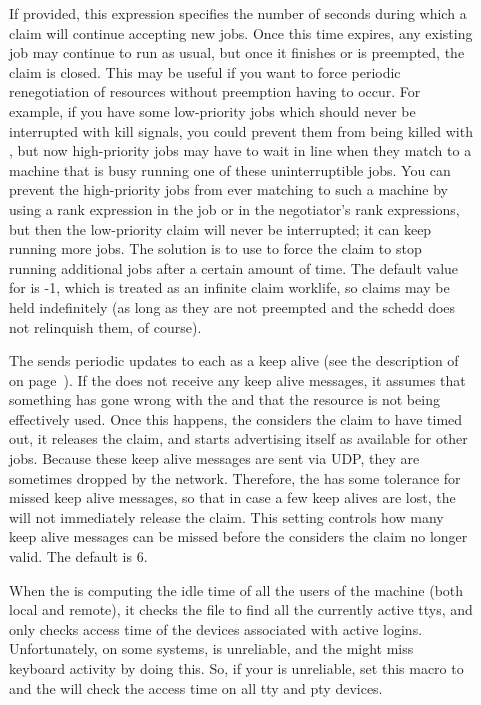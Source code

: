 \begin{description}
\item[] \label{param:ClaimWorklife}
  If provided, this expression specifies
  the number of seconds during which a claim will continue accepting new
  jobs.  Once this time expires, any existing job may continue to run as
  usual, but once it finishes or is preempted, the claim is closed.
  This may be useful if you want to force periodic renegotiation of
  resources without preemption having to occur.  For example, if you
  have some low-priority jobs which should never be interrupted with
  kill signals, you could prevent them from being killed with
  , but now high-priority jobs may have to
  wait in line when they match to a machine that is busy running one of
  these uninterruptible jobs.  You can prevent the high-priority jobs
  from ever matching to such a machine by using a rank expression in the
  job or in the negotiator's rank expressions, but then the low-priority
  claim will never be interrupted; it can keep running more jobs.  The
  solution is to use  to force the claim to stop
  running additional jobs after a certain amount of time.
  The default value for  is -1, which is treated
  as an infinite claim worklife, so claims may be held indefinitely
  (as long as they are not preempted and the schedd does not
  relinquish them, of course).

\item[]
  \label{param:MaxClaimAlivesMissed} The  sends periodic updates
  to each  as a keep alive (see the description of
   on page~\pageref{param:AliveInterval}).  
  If the  does not receive any keep alive messages, it assumes
  that something has gone wrong with the  and that the resource
  is not being effectively used.
  Once this happens, the  considers the claim to have timed out,
  it releases the claim, and starts advertising itself as available
  for other jobs.
  Because these keep alive messages are sent via UDP, they are
  sometimes dropped by the network.
  Therefore, the  has some tolerance for missed keep alive
  messages, so that in case a few keep alives are lost, the 
  will not immediately release the claim.
  This setting controls how many keep alive messages can be missed
  before the  considers the claim no longer valid.
  The default is 6.

\item[] \label{param:StartdHasBadUtmp}
  When the  is computing the idle time of all the
  users of the machine (both local and remote), it checks the
   file to find all the currently active ttys, and only
  checks access time of the devices associated with active logins.
  Unfortunately, on some systems,  is unreliable, and the
   might miss keyboard activity by doing this.  So, if your
   is unreliable, set this macro to  and the
   will check the access time on all tty and pty devices.
  

\end{description}
